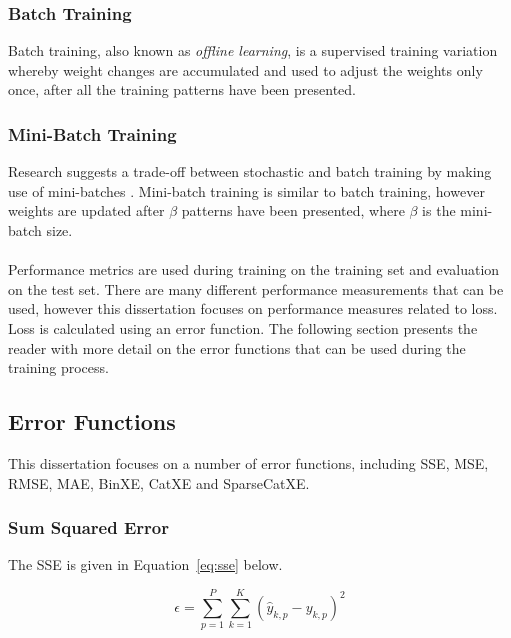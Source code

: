 \subsubsection{Batch Training}\label{sec:anns:training:batch}

Batch training, also known as \textit{offline learning}, is a supervised training variation whereby weight changes are accumulated and used to adjust the weights only once, after all the training patterns have been presented.


\subsubsection{Mini-Batch Training}\label{sec:anns:training:mini_batch}

Research suggests a trade-off between stochastic and batch training by making use of mini-batches \cite{ref:bengio:2012}. Mini-batch training is similar to batch training, however weights are updated after $\beta$ patterns have been presented, where $\beta$ is the mini-batch size.\\
\\
\noindent
Performance metrics are used during training on the training set and evaluation on the test set. There are many different performance measurements that can be used, however this dissertation focuses on performance measures related to loss. Loss is calculated using an error function. The following section presents the reader with more detail on the error functions that can be used during the training process.

\subsection{Error Functions}\label{sec:anns:training:error_functions}

This dissertation focuses on a number of error functions, including \acf{SSE}, \acf{MSE}, \acf{RMSE}, \acf{MAE}, \acf{BinXE}, \acf{CatXE} and \acf{SparseCatXE}.


\subsubsection{Sum Squared Error}\label{sec:anns:training:error_functions:sse}

The \acs{SSE} is given in Equation~\eqref{eq:sse} below.

\begin{equation}
    \epsilon = \sum_{p=1}^P \sum_{k=1}^K (\hat{y}_{k,p} - y_{k,p})^2
    \label{eq:sse}
\end{equation}

